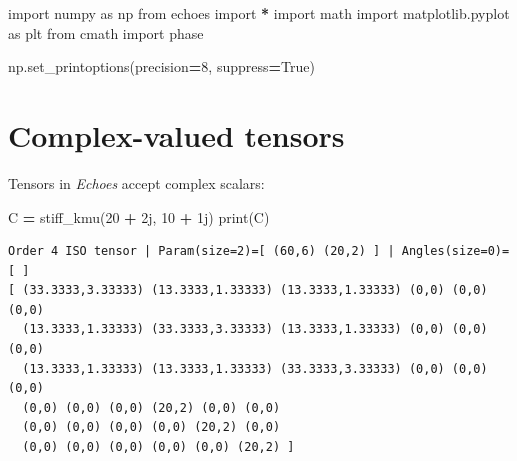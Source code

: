 \documentclass[
  a4paper,
  numbers=noendperiod,
  DIV=12]{scrreprt}
\newenvironment{Shaded}{\begin{snugshade}}{\end{snugshade}}
\newcommand{\BuiltInTok}[1]{#1}
\newcommand{\DecValTok}[1]{\textcolor[rgb]{0.00,0.00,0.81}{#1}}
\newcommand{\ImportTok}[1]{#1}
\newcommand{\NormalTok}[1]{#1}
\newcommand{\OperatorTok}[1]{\textcolor[rgb]{0.81,0.36,0.00}{\textbf{#1}}}
\newcommand{\OtherTok}[1]{\textcolor[rgb]{0.56,0.35,0.01}{#1}}
\newcommand{\VariableTok}[1]{\textcolor[rgb]{0.00,0.00,0.00}{#1}}
\begin{document}
\begin{tcolorbox}[enhanced jigsaw, arc=.35mm, bottomrule=.15mm, bottomtitle=1mm, breakable, colback=white, colbacktitle=quarto-callout-tip-color!10!white, colframe=quarto-callout-tip-color-frame, coltitle=black, left=2mm, leftrule=.75mm, opacityback=0, opacitybacktitle=0.6, rightrule=.15mm, title={Imports}, titlerule=0mm, toprule=.15mm, toptitle=1mm]

\begin{Shaded}
\begin{Highlighting}[]
\ImportTok{import}\NormalTok{ numpy }\ImportTok{as}\NormalTok{ np}
\ImportTok{from}\NormalTok{ echoes }\ImportTok{import} \OperatorTok{*}
\ImportTok{import}\NormalTok{ math}
\ImportTok{import}\NormalTok{ matplotlib.pyplot }\ImportTok{as}\NormalTok{ plt}
\ImportTok{from}\NormalTok{ cmath }\ImportTok{import}\NormalTok{ phase}

\NormalTok{np.set\_printoptions(precision}\OperatorTok{=}\DecValTok{8}\NormalTok{, suppress}\OperatorTok{=}\VariableTok{True}\NormalTok{)}
\end{Highlighting}
\end{Shaded}

\end{tcolorbox}

\section{Complex-valued tensors}\label{complex-valued-tensors}

Tensors in \emph{Echoes} accept complex scalars:

\begin{Shaded}
\begin{Highlighting}[]
\NormalTok{C }\OperatorTok{=}\NormalTok{ stiff\_kmu(}\DecValTok{20} \OperatorTok{+} \OtherTok{2j}\NormalTok{, }\DecValTok{10} \OperatorTok{+} \OtherTok{1j}\NormalTok{)}
\BuiltInTok{print}\NormalTok{(C)}
\end{Highlighting}
\end{Shaded}

\begin{verbatim}
Order 4 ISO tensor | Param(size=2)=[ (60,6) (20,2) ] | Angles(size=0)=[ ]
[ (33.3333,3.33333) (13.3333,1.33333) (13.3333,1.33333) (0,0) (0,0) (0,0) 
  (13.3333,1.33333) (33.3333,3.33333) (13.3333,1.33333) (0,0) (0,0) (0,0) 
  (13.3333,1.33333) (13.3333,1.33333) (33.3333,3.33333) (0,0) (0,0) (0,0) 
  (0,0) (0,0) (0,0) (20,2) (0,0) (0,0) 
  (0,0) (0,0) (0,0) (0,0) (20,2) (0,0) 
  (0,0) (0,0) (0,0) (0,0) (0,0) (20,2) ]
\end{verbatim}
\end{document}
